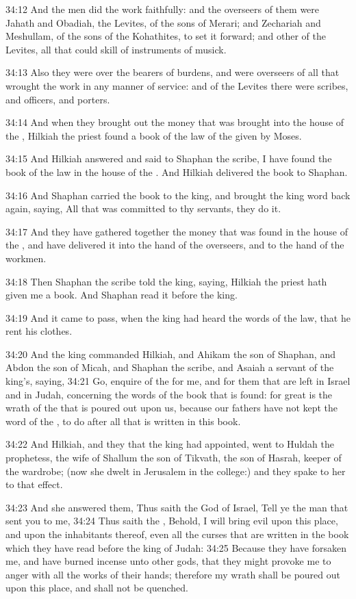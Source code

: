 34:12 And the men did the work faithfully: and the overseers of them were Jahath and Obadiah, the Levites, of the sons of Merari; and Zechariah and Meshullam, of the sons of the Kohathites, to set it forward; and other of the Levites, all that could skill of instruments of musick.

34:13 Also they were over the bearers of burdens, and were overseers of all that wrought the work in any manner of service: and of the Levites there were scribes, and officers, and porters.

34:14 And when they brought out the money that was brought into the house of the \LORD, Hilkiah the priest found a book of the law of the \LORD given by Moses.

34:15 And Hilkiah answered and said to Shaphan the scribe, I have found the book of the law in the house of the \LORD. And Hilkiah delivered the book to Shaphan.

34:16 And Shaphan carried the book to the king, and brought the king word back again, saying, All that was committed to thy servants, they do it.

34:17 And they have gathered together the money that was found in the house of the \LORD, and have delivered it into the hand of the overseers, and to the hand of the workmen.

34:18 Then Shaphan the scribe told the king, saying, Hilkiah the priest hath given me a book. And Shaphan read it before the king.

34:19 And it came to pass, when the king had heard the words of the law, that he rent his clothes.

34:20 And the king commanded Hilkiah, and Ahikam the son of Shaphan, and Abdon the son of Micah, and Shaphan the scribe, and Asaiah a servant of the king's, saying, 34:21 Go, enquire of the \LORD for me, and for them that are left in Israel and in Judah, concerning the words of the book that is found: for great is the wrath of the \LORD that is poured out upon us, because our fathers have not kept the word of the \LORD, to do after all that is written in this book.

34:22 And Hilkiah, and they that the king had appointed, went to Huldah the prophetess, the wife of Shallum the son of Tikvath, the son of Hasrah, keeper of the wardrobe; (now she dwelt in Jerusalem in the college:) and they spake to her to that effect.

34:23 And she answered them, Thus saith the \LORD God of Israel, Tell ye the man that sent you to me, 34:24 Thus saith the \LORD, Behold, I will bring evil upon this place, and upon the inhabitants thereof, even all the curses that are written in the book which they have read before the king of Judah: 34:25 Because they have forsaken me, and have burned incense unto other gods, that they might provoke me to anger with all the works of their hands; therefore my wrath shall be poured out upon this place, and shall not be quenched.

